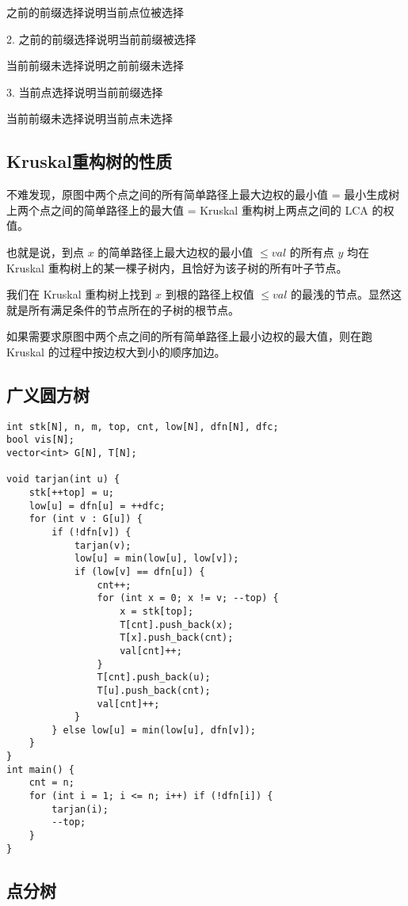 \documentclass[a4paper]{article}
\begin{document}
之前的前缀选择说明当前点位被选择  

2. 之前的前缀选择说明当前前缀被选择

当前前缀未选择说明之前前缀未选择  

3. 当前点选择说明当前前缀选择  

当前前缀未选择说明当前点未选择

\subsection{Kruskal重构树的性质}
不难发现，原图中两个点之间的所有简单路径上最大边权的最小值 = 最小生成树上两个点之间的简单路径上的最大值 = Kruskal 重构树上两点之间的 LCA 的权值。

也就是说，到点 $x$ 的简单路径上最大边权的最小值 $\leq val$ 的所有点 $y$ 均在 Kruskal 重构树上的某一棵子树内，且恰好为该子树的所有叶子节点。

我们在 Kruskal 重构树上找到 $x$ 到根的路径上权值 $\leq val$ 的最浅的节点。显然这就是所有满足条件的节点所在的子树的根节点。

如果需要求原图中两个点之间的所有简单路径上最小边权的最大值，则在跑 Kruskal 的过程中按边权大到小的顺序加边。

\subsection{广义圆方树}
\begin{lstlisting}
int stk[N], n, m, top, cnt, low[N], dfn[N], dfc;
bool vis[N];
vector<int> G[N], T[N];

void tarjan(int u) {
    stk[++top] = u;
    low[u] = dfn[u] = ++dfc;
    for (int v : G[u]) {
        if (!dfn[v]) {
            tarjan(v);
            low[u] = min(low[u], low[v]);
            if (low[v] == dfn[u]) {
                cnt++;
                for (int x = 0; x != v; --top) {
                    x = stk[top];
                    T[cnt].push_back(x);
                    T[x].push_back(cnt);
                    val[cnt]++;
                }
                T[cnt].push_back(u);
                T[u].push_back(cnt);
                val[cnt]++;
            }
        } else low[u] = min(low[u], dfn[v]);
    }
}
int main() {
    cnt = n;
    for (int i = 1; i <= n; i++) if (!dfn[i]) {
        tarjan(i);
        --top;
    }
}
\end{lstlisting}

\subsection{点分树}
\end{document}
